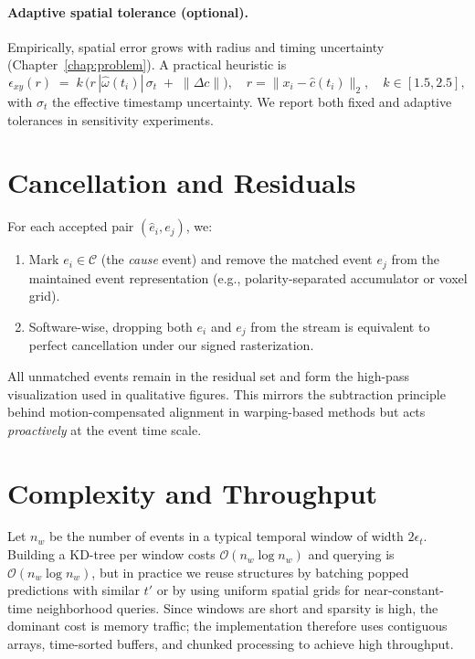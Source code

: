\paragraph{Adaptive spatial tolerance (optional).}
Empirically, spatial error grows with radius and timing uncertainty (Chapter~\ref{chap:problem}). A practical heuristic is
\begin{equation}
\epsilon_{xy}(r) \;=\; k \,\big(r\,|\hat\omega(t_i)|\,\sigma_t \;+\; \|\Delta c\|\big),
\quad r=\|x_i-\hat c(t_i)\|_2, \quad k\in[1.5,2.5],
\label{eq:adaptive-eps}
\end{equation}
with $\sigma_t$ the effective timestamp uncertainty. We report both fixed and adaptive tolerances in sensitivity experiments.

\section{Cancellation and Residuals}
For each accepted pair $(\hat e_i,e_j)$, we:
\begin{enumerate}
    \item Mark $e_i \in \mathcal{C}$ (the \emph{cause} event) and remove the matched event $e_j$ from the maintained event representation (e.g., polarity-separated accumulator or voxel grid).
    \item Software-wise, dropping both $e_i$ and $e_j$ from the stream is equivalent to perfect cancellation under our signed rasterization.
\end{enumerate}
All unmatched events remain in the residual set and form the high-pass visualization used in qualitative figures. This mirrors the subtraction principle behind motion-compensated alignment in warping-based methods \cite{Gallego2018CMax,Stoffregen2019Segmentation} but acts \emph{proactively} at the event time scale.

\section{Complexity and Throughput}
Let $n_w$ be the number of events in a typical temporal window of width $2\epsilon_t$. Building a KD-tree per window costs $\mathcal{O}(n_w\log n_w)$ and querying is $\mathcal{O}(n_w\log n_w)$, but in practice we reuse structures by batching popped predictions with similar $t'$ or by using uniform spatial grids for near-constant-time neighborhood queries. Since windows are short and sparsity is high, the dominant cost is memory traffic; the implementation therefore uses contiguous arrays, time-sorted buffers, and chunked processing to achieve high throughput.

